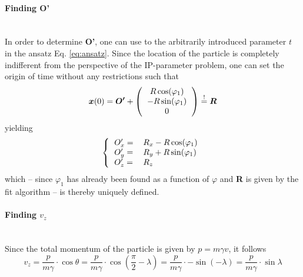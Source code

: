\paragraph{Finding \textbf{O'}}\mbox{}\\
In order to determine \textbf{O'}, one can use to the arbitrarily introduced parameter $t$ in the ansatz Eq. \ref{eq:ansatz}. Since the location of the particle is completely indifferent from the perspective of the IP-parameter problem, one can set the origin of time without any restrictions such that
\begin{equation}
	\boldsymbol{x}(0) = \boldsymbol{O'} +  \left(\begin{tabular}{c}
	$R\cos(\varphi_1) $\\ 
	$-R\sin(\varphi_1) $\\ 
	$0$\\
	\end{tabular} \right) \stackrel{!}{=} \boldsymbol{R}
\end{equation}
yielding
\begin{equation}
	\left\lbrace\begin{tabular}{ll}
	$O'_x =$&$R_x-R\cos(\varphi_1) $\\ 
	$O'_y =$&$R_y+R\sin(\varphi_1) $\\ 
	$O'_z =$&$R_z$\\
	\end{tabular} \right.
\end{equation}
which -- since $\varphi_1$ has already been found as a function of $\varphi$ and \textbf{R} is given by the fit algorithm -- is thereby uniquely defined.
\paragraph{Finding $v_z$}\mbox{}\\
Since the total momentum of the particle is given by $p = m\gamma v$, it follows
\begin{equation}
	v_z = \frac{p}{m\gamma}\cdot\cos\theta = \frac{p}{m\gamma}\cdot\cos\left(\frac{\pi}{2}-\lambda\right) =\frac{p}{m\gamma}\cdot -\sin(-\lambda) =  \frac{p}{m\gamma}\cdot\sin\lambda 
\end{equation}
